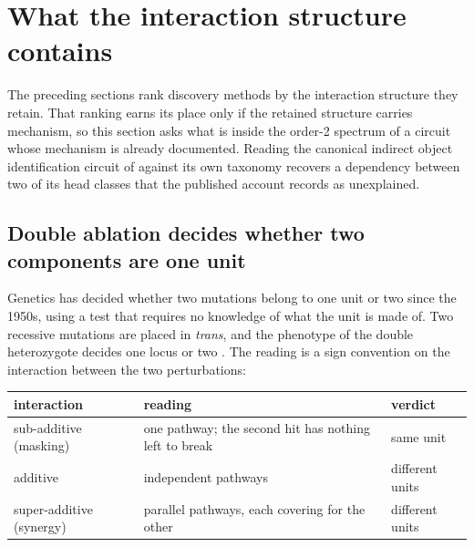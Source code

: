 %

\section{What the interaction structure contains}
\label{sec:what-epistasis-contains}

The preceding sections rank discovery methods by the interaction structure they retain.
That ranking earns its place only if the retained structure carries mechanism, so this
section asks what is inside the order-2 spectrum of a circuit whose mechanism is already
documented. Reading the canonical indirect object identification circuit of
\citet{wang2022ioi} against its own taxonomy recovers a dependency between two of its head
classes that the published account records as unexplained.

\subsection{Double ablation decides whether two components are one unit}

Genetics has decided whether two mutations belong to one unit or two since the 1950s, using
a test that requires no knowledge of what the unit is made of. Two recessive mutations are
placed in \emph{trans}, and the phenotype of the double heterozygote decides one locus or
two \citep{benzer1955}. The reading is a sign convention on the interaction between the two
perturbations:

\begin{center}
\begin{tabular}{lll}
\toprule
interaction & reading & verdict \\
\midrule
sub-additive (masking) & one pathway; the second hit has nothing left to break & same unit \\
additive & independent pathways & different units \\
super-additive (synergy) & parallel pathways, each covering for the other & different units \\
\bottomrule
\end{tabular}
\end{center}

